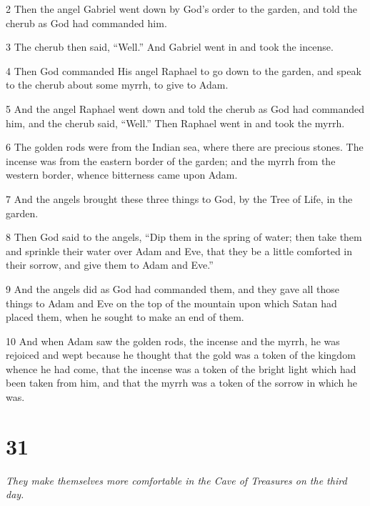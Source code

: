 \par 2 Then the angel Gabriel went down by God's order to the garden, and told the cherub as God had commanded him.

\par 3 The cherub then said, “Well.” And Gabriel went in and took the incense.

\par 4 Then God commanded His angel Raphael to go down to the garden, and speak to the cherub about some myrrh, to give to Adam.

\par 5 And the angel Raphael went down and told the cherub as God had commanded him, and the cherub said, “Well.” Then Raphael went in and took the myrrh.

\par 6 The golden rods were from the Indian sea, where there are precious stones. The incense was from the eastern border of the garden; and the myrrh from the western border, whence bitterness came upon Adam.

\par 7 And the angels brought these three things to God, by the Tree of Life, in the garden.

\par 8 Then God said to the angels, “Dip them in the spring of water; then take them and sprinkle their water over Adam and Eve, that they be a little comforted in their sorrow, and give them to Adam and Eve.”

\par 9 And the angels did as God had commanded them, and they gave all those things to Adam and Eve on the top of the mountain upon which Satan had placed them, when he sought to make an end of them.

\par 10 And when Adam saw the golden rods, the incense and the myrrh, he was rejoiced and wept because he thought that the gold was a token of the kingdom whence he had come, that the incense was a token of the bright light which had been taken from him, and that the myrrh was a token of the sorrow in which he was.

\chapter{31}

\par \textit{They make themselves more comfortable in the Cave of Treasures on the third day.}

